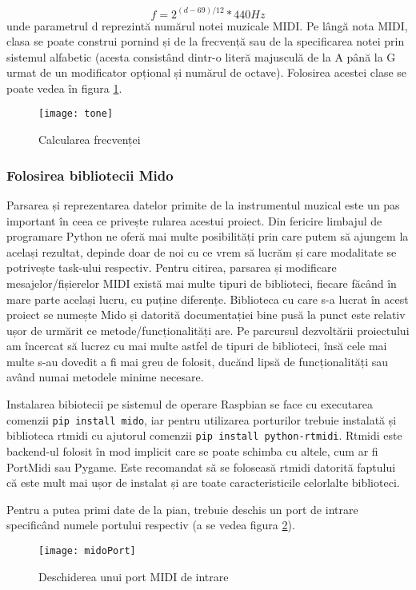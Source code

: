 \documentclass[../IoMusT.tex]{subfiles}
\begin{document}
\[ f = 2^{(d-69)/12} * 440Hz\]
unde parametrul d reprezintă numărul notei muzicale MIDI. Pe lângă nota MIDI, clasa se poate construi pornind și de la frecvență sau de la specificarea notei prin sistemul alfabetic (acesta consistând dintr-o literă majusculă de la A până la G urmat de un modificator opțional și numărul de octave). Folosirea acestei clase se poate vedea în figura \ref{fig:tone}.
\begin{figure}[h]
\centering
\texttt{[image: tone]}
\caption{Calcularea frecvenței}
\label{fig:tone}
\end{figure}

\subsubsection{Folosirea bibliotecii Mido}
Parsarea și reprezentarea datelor primite de la instrumentul muzical este un pas important în ceea ce privește rularea acestui proiect. Din fericire limbajul de programare Python ne oferă mai multe posibilități prin care putem să ajungem la același rezultat, depinde doar de noi cu ce vrem să lucrăm și care modalitate se potrivește task-ului respectiv. Pentru citirea, parsarea și modificare mesajelor/fișierelor MIDI există mai multe tipuri de biblioteci, fiecare făcând în mare parte același lucru, cu puține diferențe. Biblioteca cu care s-a lucrat în acest proiect se numește Mido și datorită documentației bine pusă la punct este relativ ușor de urmărit ce metode/funcționalități are. Pe parcursul dezvoltării proiectului am încercat să lucrez cu mai multe astfel de tipuri de biblioteci, însă cele mai multe s-au dovedit a fi mai greu de folosit, ducănd lipsă de funcționalități sau având numai metodele minime necesare.
\\
\par Instalarea bibiotecii pe sistemul de operare Raspbian se face cu executarea comenzii \verb|pip install mido|, iar pentru utilizarea porturilor trebuie instalată și biblioteca rtmidi cu ajutorul comenzii \verb|pip install python-rtmidi|. Rtmidi este backend-ul folosit în mod implicit care se poate schimba cu altele, cum ar fi PortMidi sau Pygame. Este recomandat să se foloseasă rtmidi datorită faptului că este mult mai ușor de instalat și are toate caracteristicile celorlalte biblioteci. 
\\
\par Pentru a putea primi date de la pian, trebuie deschis un port de intrare specificând numele portului respectiv (a se vedea figura \ref{fig:port}).
\begin{figure}[h]
\centering
\texttt{[image: midoPort]}
\caption{Deschiderea unui port MIDI de intrare}
\label{fig:port}
\end{figure}
\end{document}
